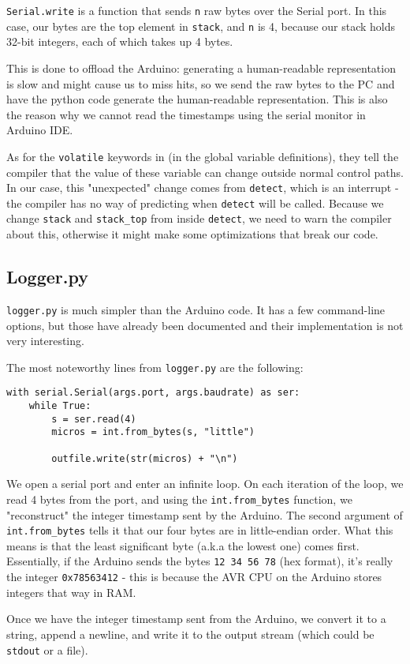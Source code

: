 \documentclass[11pt]{article}
\begin{document}
\texttt{Serial.write} is a function that sends \texttt{n} raw bytes over the Serial port. In this case, our bytes are the top element in \texttt{stack}, and \texttt{n} is 4, because our stack holds 32-bit integers, each of which takes up 4 bytes.

This is done to offload the Arduino: generating a human-readable representation is slow and might cause us to miss hits, so we send the raw bytes to the PC and have the python code generate the human-readable representation. This is also the reason why we cannot read the timestamps using the serial monitor in Arduino IDE.

As for the \texttt{volatile} keywords in (in the global variable definitions), they tell the compiler that the value of these variable can change outside normal control paths. In our case, this "unexpected" change comes from \texttt{detect}, which is an interrupt - the compiler has no way of predicting when \texttt{detect} will be called. Because we change \texttt{stack} and \texttt{stack\_top} from inside \texttt{detect}, we need to warn the compiler about this, otherwise it might make some optimizations that break our code.

\subsection{Logger.py}
\label{sec:orgff92673}
\texttt{logger.py} is much simpler than the Arduino code. It has a few command-line options, but those have already been documented and their implementation is not very interesting.

The most noteworthy lines from \texttt{logger.py} are the following:

\begin{verbatim}
with serial.Serial(args.port, args.baudrate) as ser:
    while True:
        s = ser.read(4)
        micros = int.from_bytes(s, "little")

        outfile.write(str(micros) + "\n")
\end{verbatim}

We open a serial port and enter an infinite loop. On each iteration of the loop, we read 4 bytes from the port, and using the \texttt{int.from\_bytes} function, we "reconstruct" the integer timestamp sent by the Arduino. The second argument of \texttt{int.from\_bytes} tells it that our four bytes are in little-endian order. What this means is that the least significant byte (a.k.a the lowest one) comes first. Essentially, if the Arduino sends the bytes \texttt{12 34 56 78} (hex format), it's really the integer \texttt{0x78563412} - this is because the AVR CPU on the Arduino stores integers that way in RAM.

Once we have the integer timestamp sent from the Arduino, we convert it to a string, append a newline, and write it to the output stream (which could be \texttt{stdout} or a file).
\end{document}
